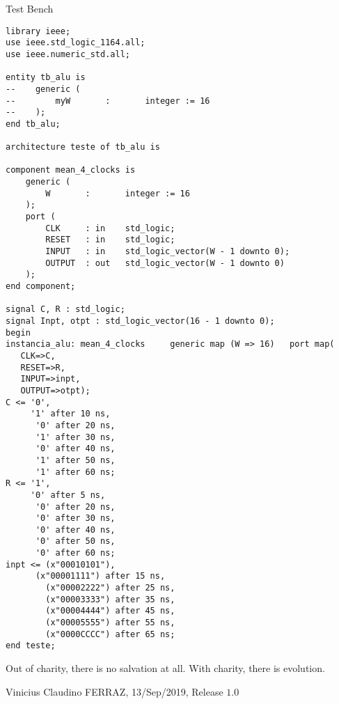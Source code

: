 \documentclass[12pt]{article}
\begin{document}
\vspace{10mm}

\Large

\begin{center}
Test Bench
\end{center}

\normalsize

\begin{verbatim}
library ieee;
use ieee.std_logic_1164.all;
use ieee.numeric_std.all;

entity tb_alu is
--    generic (
--        myW       :       integer := 16
--    );
end tb_alu;

architecture teste of tb_alu is

component mean_4_clocks is
    generic (
        W       :       integer := 16
    );
    port (
        CLK     : in    std_logic;
        RESET   : in    std_logic;
        INPUT   : in    std_logic_vector(W - 1 downto 0);
        OUTPUT  : out   std_logic_vector(W - 1 downto 0)
    );
end component;

signal C, R : std_logic;
signal Inpt, otpt : std_logic_vector(16 - 1 downto 0);
begin
instancia_alu: mean_4_clocks     generic map (W => 16)	 port map(
   CLK=>C,
   RESET=>R,
   INPUT=>inpt,
   OUTPUT=>otpt);
C <= '0',
     '1' after 10 ns,
	  '0' after 20 ns,
	  '1' after 30 ns,
	  '0' after 40 ns,
	  '1' after 50 ns,
	  '1' after 60 ns;
R <= '1',
     '0' after 5 ns,
	  '0' after 20 ns,
	  '0' after 30 ns,
	  '0' after 40 ns,
	  '0' after 50 ns,
	  '0' after 60 ns;
inpt <= (x"00010101"),
      (x"00001111") after 15 ns,
		(x"00002222") after 25 ns,
		(x"00003333") after 35 ns,
		(x"00004444") after 45 ns,
		(x"00005555") after 55 ns,
		(x"0000CCCC") after 65 ns;
end teste;
\end{verbatim}


\vspace{3mm}

Out of charity, there is no salvation at all. With charity, there is evolution.

\vspace{3mm}

Vinicius Claudino FERRAZ, 13/Sep/2019, Release $1.0$
\end{document}
